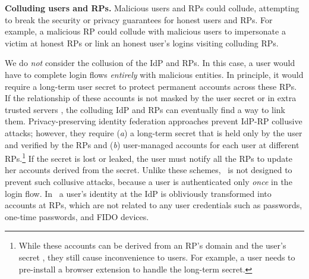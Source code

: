 \noindent \textbf{Colluding users and RPs.}
Malicious users and RPs could collude,
 attempting to break the security or privacy guarantees for honest users and RPs.
For example, a malicious RP could collude with malicious users to %
 impersonate a victim at honest RPs or link an honest user's logins visiting colluding RPs.

We do \emph{not} consider the collusion of the IdP and RPs.
In this case, a user would have to complete login flows \emph{entirely} with malicious entities. 
In principle, it would require a long-term user secret to protect permanent accounts across these RPs.
If the relationship of these accounts is not masked by the user secret or in extra trusted servers \cite{miso},
 the colluding IdP and RPs can eventually find a way to link them.
Privacy-preserving identity federation approaches \cite{ELPASSO, UnlimitID, idemix, PseudoID, Opaak, uprov} prevent IdP-RP collusive attacks;
however, they require (\emph{a}) a long-term secret that is held only by the user and verified by the RPs and (\emph{b}) user-managed accounts for each user at different RPs.\footnote{While these accounts can be derived from an RP's domain and the user's secret \cite{ELPASSO, UnlimitID, Opaak, uprov,idemix},
 they still cause inconvenience to users.
For example, a user needs to pre-install a browser extension to handle the long-term secret.}
If the secret is lost or leaked, the user must notify all the RPs to update her accounts derived from the secret.
Unlike these schemes, \usso\ is not designed to prevent such collusive attacks,
 because a user is authenticated only \emph{once} in the login flow.
In \usso\ a user's identity at the IdP is obliviously transformed into accounts at RPs,
 which are not related to any user credentials such as passwords, one-time passwords, %
  and FIDO devices.


